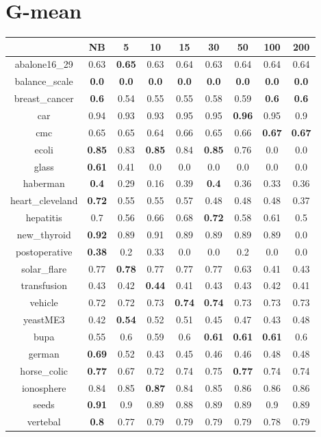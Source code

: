 \documentclass{article}%
\begin{document}
%
\section*{G{-}mean}%
\begin{tabular}{c|cccccccc}%
\hline%
&NB&5&10&15&30&50&100&200\\%
\hline%
abalone16\_29&0.63&\textbf{0.65}&0.63&0.64&0.63&0.64&0.64&0.64\\%
\hline%
balance\_scale&\textbf{0.0}&\textbf{0.0}&\textbf{0.0}&\textbf{0.0}&\textbf{0.0}&\textbf{0.0}&\textbf{0.0}&\textbf{0.0}\\%
\hline%
breast\_cancer&\textbf{0.6}&0.54&0.55&0.55&0.58&0.59&\textbf{0.6}&\textbf{0.6}\\%
\hline%
car&0.94&0.93&0.93&0.95&0.95&\textbf{0.96}&0.95&0.9\\%
\hline%
cmc&0.65&0.65&0.64&0.66&0.65&0.66&\textbf{0.67}&\textbf{0.67}\\%
\hline%
ecoli&\textbf{0.85}&0.83&\textbf{0.85}&0.84&\textbf{0.85}&0.76&0.0&0.0\\%
\hline%
glass&\textbf{0.61}&0.41&0.0&0.0&0.0&0.0&0.0&0.0\\%
\hline%
haberman&\textbf{0.4}&0.29&0.16&0.39&\textbf{0.4}&0.36&0.33&0.36\\%
\hline%
heart\_cleveland&\textbf{0.72}&0.55&0.55&0.57&0.48&0.48&0.48&0.37\\%
\hline%
hepatitis&0.7&0.56&0.66&0.68&\textbf{0.72}&0.58&0.61&0.5\\%
\hline%
new\_thyroid&\textbf{0.92}&0.89&0.91&0.89&0.89&0.89&0.89&0.0\\%
\hline%
postoperative&\textbf{0.38}&0.2&0.33&0.0&0.0&0.2&0.0&0.0\\%
\hline%
solar\_flare&0.77&\textbf{0.78}&0.77&0.77&0.77&0.63&0.41&0.43\\%
\hline%
transfusion&0.43&0.42&\textbf{0.44}&0.41&0.43&0.43&0.42&0.41\\%
\hline%
vehicle&0.72&0.72&0.73&\textbf{0.74}&\textbf{0.74}&0.73&0.73&0.73\\%
\hline%
yeastME3&0.42&\textbf{0.54}&0.52&0.51&0.45&0.47&0.43&0.48\\%
\hline%
bupa&0.55&0.6&0.59&0.6&\textbf{0.61}&\textbf{0.61}&\textbf{0.61}&0.6\\%
\hline%
german&\textbf{0.69}&0.52&0.43&0.45&0.46&0.46&0.48&0.48\\%
\hline%
horse\_colic&\textbf{0.77}&0.67&0.72&0.74&0.75&\textbf{0.77}&0.74&0.74\\%
\hline%
ionosphere&0.84&0.85&\textbf{0.87}&0.84&0.85&0.86&0.86&0.86\\%
\hline%
seeds&\textbf{0.91}&0.9&0.89&0.88&0.89&0.89&0.9&0.89\\%
\hline%
vertebal&\textbf{0.8}&0.77&0.79&0.79&0.79&0.79&0.78&0.79\\%
\hline%
\end{tabular}

%
\end{document}
